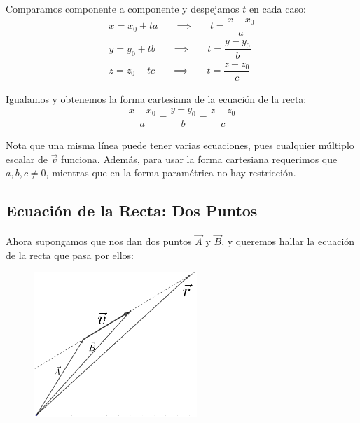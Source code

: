 \documentclass[12pt, fleqn]{report}                             %
\DeclareMathOperator \Space {\quad}                             %
\theoremstyle{break}                                            %
\begin{document}
                Comparamos componente a componente y despejamos $t$ en cada caso:
                \begin{align*}
                    x = x_0 + ta \Space \implies \Space t = \dfrac{x - x_0}{a}  \\
                    y = y_0 + tb \Space \implies \Space t = \dfrac{y - y_0}{b}  \\
                    z = z_0 + tc \Space \implies \Space t = \dfrac{z - z_0}{c}
                \end{align*}
                
                Igualamos y obtenemos la forma cartesiana de la ecuación de la recta:
                \begin{align}
                      \dfrac{x - x_0}{a} 
                    = \dfrac{y - y_0}{b}
                    = \dfrac{z - z_0}{c} \label{lineEquation1}
                \end{align}
                
                Nota que una misma línea puede tener varias ecuaciones, pues cualquier múltiplo
                escalar de $\vec{v}$ funciona. Además, para usar la forma cartesiana requerimos
                que $a, b, c\neq 0$, mientras que en la forma paramétrica no hay restricción.
                


            \subsection{Ecuación de la Recta: Dos Puntos}
            
                Ahora supongamos que nos dan dos puntos $\vec{A}$ y $\vec{B}$, y queremos hallar
                la ecuación de la recta que pasa por ellos:
                
                \begin{figure}[H]
                    \centering
                    \includegraphics[width=0.55\textwidth]{line2}
                \end{figure}
            
\end{document}
